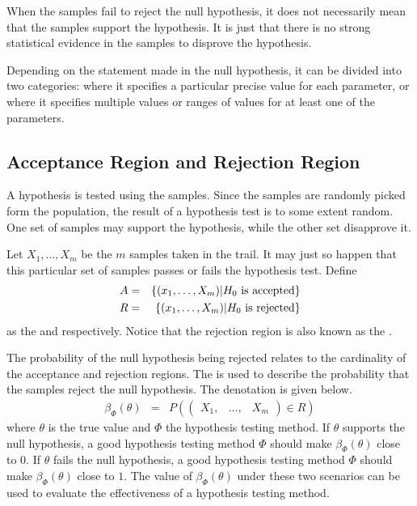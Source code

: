 When the samples fail to reject the null hypothesis, it does not necessarily mean that the samples support the hypothesis. It is just that there is no strong statistical evidence in the samples to disprove the hypothesis.

Depending on the statement made in the null hypothesis, it can be divided into two categories:  where it specifies a particular precise value for each parameter, or  where it specifies multiple values or ranges of values for at least one of the parameters. 

\subsection{Acceptance Region and Rejection Region}

A hypothesis is tested using the samples. Since the samples are randomly picked form the population, the result of a hypothesis test is to some extent random. One set of samples may support the hypothesis, while the other set disapprove it.

Let $X_1, \ldots, X_m$ be the $m$ samples taken in the trail. It may just so happen that this particular set of samples passes or fails the hypothesis test. Define
\begin{eqnarray}
	A &=& \left\{\left(x_1, \ldots, X_m\right)\middle| H_0 \textup{~is accepted}\right\} \label{eq:htest_a} \\
	R &=& \left\{\left(x_1, \ldots, X_m\right)\middle| H_0 \textup{~is rejected}\right\} \label{eq:htest_r}
\end{eqnarray}
as the  and  respectively. Notice that the rejection region is also known as the . 

The probability of the null hypothesis being rejected relates to the cardinality of the acceptance and rejection regions. The  is used to describe the probability that the samples reject the null hypothesis. The denotation is given below.
\begin{eqnarray}
	\beta_\Phi(\theta) &=& P\left(\left(\begin{array}{ccc}
		X_1, & \ldots, & X_m
	\end{array}\right)\in R\right) \nonumber
\end{eqnarray}
where $\theta$ is the true value and $\Phi$ the hypothesis testing method. If $\theta$ supports the null hypothesis, a good hypothesis testing method $\Phi$ should make $\beta_\Phi(\theta)$ close to $0$. If $\theta$ fails the null hypothesis, a good hypothesis testing method $\Phi$ should make $\beta_\Phi(\theta)$ close to $1$. The value of $\beta_\Phi(\theta)$ under these two scenarios can be used to evaluate the effectiveness of a hypothesis testing method.

